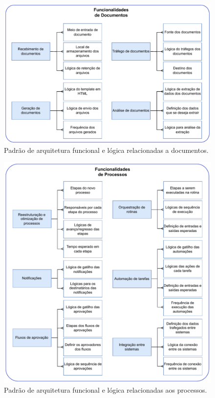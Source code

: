 	\begin{figure}[H]
		\centering
		\includegraphics[width=1\textwidth]{./figuras/documetFunctionalities.pdf}
		\caption{Padrão de arquitetura funcional e lógica relacionadas a documentos.}
		\label{fig:metodologia:documetFunctionalities}
	\end{figure}

	\begin{figure}[H]
		\centering
		\includegraphics[width=1\textwidth]{./figuras/processFunctionalities.pdf}
		\caption{Padrão de arquitetura funcional e lógica relacionadas aos processos.}
		\label{fig:metodologia:processFunctionalities}
	\end{figure}

